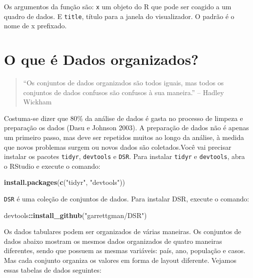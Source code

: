 \documentclass[]{book}
\newenvironment{Shaded}{\begin{snugshade}}{\end{snugshade}}
\newcommand{\KeywordTok}[1]{\textcolor[rgb]{0.13,0.29,0.53}{\textbf{#1}}}
\newcommand{\NormalTok}[1]{#1}
\newcommand{\OperatorTok}[1]{\textcolor[rgb]{0.81,0.36,0.00}{\textbf{#1}}}
\newcommand{\StringTok}[1]{\textcolor[rgb]{0.31,0.60,0.02}{#1}}
\begin{document}
Os argumentos da função são: \texttt{x} um objeto do R que pode ser coagido a um quadro de dados. E \texttt{title}, título para a janela do visualizador. O padrão é o nome de x prefixado.

\hypertarget{o-que-uxe9-dados-organizados}{%
\section{O que é Dados organizados?}\label{o-que-uxe9-dados-organizados}}

\begin{quote}
``Os conjuntos de dados organizados são todos iguais, mas todos os conjuntos de dados confusos são confusos à sua maneira.'' -- Hadley Wickham
\end{quote}

Costuma-se dizer que 80\% da análise de dados é gasta no processo de limpeza e preparação os dados (Dasu e Johnson 2003). A preparação de dados não é apenas um primeiro passo, mas deve ser repetidos muitos ao longo da análise, à medida que novos problemas surgem ou novos dados são coletados.Você vai precisar instalar os pacotes \texttt{tidyr}, \texttt{devtools} e \texttt{DSR}. Para instalar \texttt{tidyr} e \texttt{devtools}, abra o RStudio e execute o comando:

\begin{Shaded}
\begin{Highlighting}[]
\KeywordTok{install.packages}\NormalTok{(}\KeywordTok{c}\NormalTok{(}\StringTok{"tidyr"}\NormalTok{, }\StringTok{"devtools"}\NormalTok{))}
\end{Highlighting}
\end{Shaded}

\texttt{DSR} é uma coleção de conjuntos de dados. Para instalar DSR, execute o comando:

\begin{Shaded}
\begin{Highlighting}[]
\NormalTok{devtools}\OperatorTok{::}\KeywordTok{install_github}\NormalTok{(}\StringTok{"garrettgman/DSR"}\NormalTok{)}
\end{Highlighting}
\end{Shaded}

Os dados tabulares podem ser organizados de várias maneiras. Os conjuntos de dados abaixo mostram os mesmos dados organizados de quatro maneiras diferentes, sendo que possuem as mesmas variáveis: país, ano, população e casos. Mas cada conjunto organiza os valores em forma de layout diferente. Vejamos essas tabelas de dados seguintes:
\end{document}
